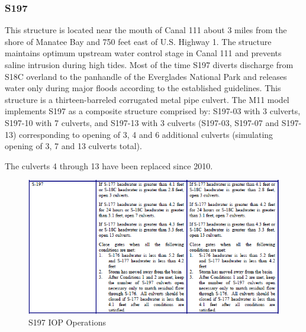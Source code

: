 


\clearpage
\subsubsection{S197}
This structure is located near the mouth of Canal 111 about 3 miles from the shore of Manatee Bay and 750 feet east of U.S. Highway 1. The structure maintains optimum upstream water control stage in Canal 111 and prevents saline intrusion during high tides. Most of the time S197 diverts discharge from S18C overland to the panhandle of the Everglades National Park and releases water only during major floods according to the established guidelines. This structure is a thirteen-barreled corrugated metal pipe culvert. The M11 model implements S197 as a composite structure comprised by: S197-03 with 3 culverts, S197-10 with 7 culverts, and S197-13 with 3 culverts (S197-03, S197-07 and S197-13) corresponding to opening of 3, 4 and 6 additional culverts (simulating opening of 3, 7 and 13 culverts total).

The culverts 4 through 13 have been replaced since 2010.

\begin{figure}[!h]
  \begin{center}
  \includegraphics[width=6.5in]{../figs/S197_IOPops.png}
  \caption{S197 IOP Operations}
  \label{fig:S197iop}
  \end{center}
\end{figure}


